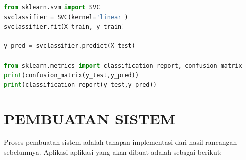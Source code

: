 \begin{enumerate} [1.]
\begin{lstlisting}[label=classifier,language=Python]
from sklearn.svm import SVC
svclassifier = SVC(kernel='linear')
svclassifier.fit(X_train, y_train)

y_pred = svclassifier.predict(X_test)

from sklearn.metrics import classification_report, confusion_matrix
print(confusion_matrix(y_test,y_pred))
print(classification_report(y_test,y_pred))
\end{lstlisting}
\end{enumerate}

\section{PEMBUATAN SISTEM}
\par Proses pembuatan sistem adalah tahapan implementasi dari hasil rancangan sebelumnya. Aplikasi-aplikasi yang akan dibuat adalah sebagai berikut:
